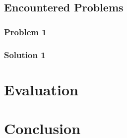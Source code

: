 \documentclass[
	accentcolor=1c,%
	type=intern,
	marginpar=false,
	ruledheaders=section,
	class=report,
	BCOR=5mm,
      parskip=half-,
	fontsize=10pt
	]{tudapub}
\begin{document}
\subsection*{Encountered Problems}
\justify{}

\subsubsection*{Problem 1}
\justify{}

\subsubsection*{Solution 1}
\justify{}


\newpage
\section*{Evaluation}
\justify{}

\newpage
\section*{Conclusion}
\justify{}
\end{document}
